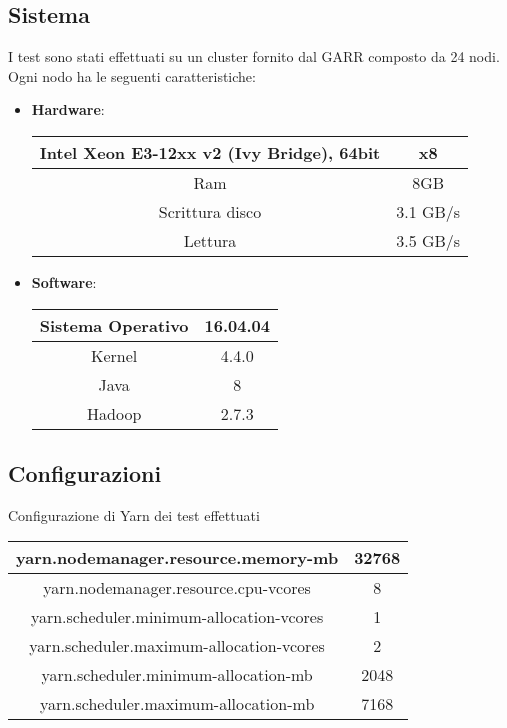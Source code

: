 \subsection{Sistema}
I test sono stati effettuati su un cluster fornito dal GARR composto da 24 nodi.\\
Ogni nodo ha le seguenti caratteristiche:\\
\begin{itemize}
\item \textbf{Hardware}:\\

\begin{center}
\begin{tabular}{ | c | c |} 
\hline
Intel Xeon E3-12xx v2 (Ivy Bridge), 64bit & x8 \\ 
\hline
Ram & 8GB \\ 
\hline
Scrittura disco & 3.1 GB/s \\
\hline
Lettura & 3.5 GB/s \\ 
\hline
\end{tabular}
\end{center}

\item \textbf{Software}:\\

\begin{center}
\begin{tabular}{ | c | c |} 
\hline
Sistema Operativo & 16.04.04 \\ 
\hline
Kernel & 4.4.0 \\ 
\hline
Java & 8 \\
\hline
Hadoop & 2.7.3 \\ 
\hline
\end{tabular}
\end{center}
\end{itemize}

\subsection{Configurazioni}
Configurazione di Yarn dei test effettuati

\begin{center}
\begin{tabular}{ | c | c |} 
\hline
yarn.nodemanager.resource.memory-mb & 32768 \\ 
\hline
yarn.nodemanager.resource.cpu-vcores & 8 \\ 
\hline
yarn.scheduler.minimum-allocation-vcores & 1 \\
\hline
yarn.scheduler.maximum-allocation-vcores & 2 \\ 
\hline
yarn.scheduler.minimum-allocation-mb & 2048 \\
\hline
yarn.scheduler.maximum-allocation-mb & 7168 \\
\hline
\end{tabular}
\end{center}

